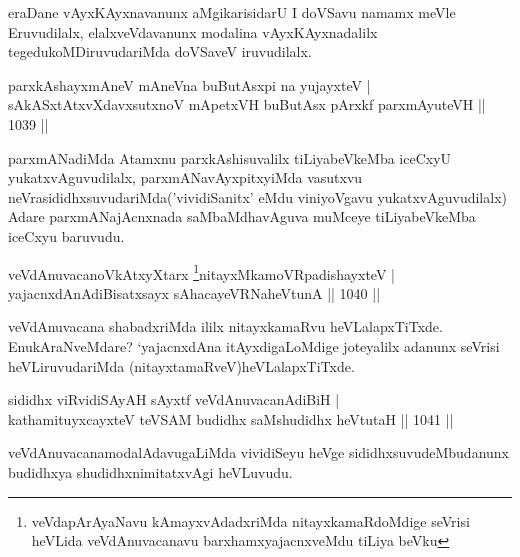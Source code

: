 \begin{artha}
eraDane vAyxKAyxnavanunx aMgikarisidarU I doVSavu namamx meVle Eruvudilalx, 
elalxveVdavanunx modalina vAyxKAyxnadalilx tegedukoMDiruvudariMda doVSaveV iruvudilalx.
\end{artha}


\begin{shl}
parxkAshayxmAneV mAneVna buButAsx\s pi na yujayxteV |\\
sAkASxtAtxvXdavxsutxnoV mApetxVH buButAsx pArxkf parxmAyuteVH || 1039 ||
\end{shl}

\begin{artha}
parxmANadiMda Atamxnu parxkAshisuvalilx tiLiyabeVkeMba iceCxyU yukatxvAguvudilalx, parxmANavAyxpitxyiMda vasutxvu neVrasididhxsuvudariMda('vividiSanitx' eMdu viniyoVgavu yukatxvAguvudilalx) Adare parxmANajAcnxnada saMbaMdhavAguva muMceye tiLiyabeVkeMba iceCxyu baruvudu.
\end{artha}



\begin{shl}
veVdAnuvacanoVkAtxyX\s tarx \footnote{veVdapArAyaNavu kAmayxvAdadxriMda nitayxkamaRdoMdige seVrisi heVLida 
veVdAnuvacanavu barxhamxyajacnxveMdu tiLiya beVku}nitayxMkamoVRpadishayxteV |\\
yajacnxdAnAdiBisatxsayx sAhacayeVRNaheVtunA || 1040 ||
\end{shl}

\begin{artha}
veVdAnuvacana shabadxriMda ililx nitayxkamaRvu heVLalapxTiTxde. EnukAraNveMdare? `yajacnxdAna itAyxdigaLoMdige joteyalilx adanunx seVrisi heVLiruvudariMda (nitayxtamaRveV)heVLalapxTiTxde.
\end{artha}

\begin{shl}
sididhx viRvidiSAyAH sAyxtf veVdAnuvacanAdiBiH |\\
kathamituyxcayxteV teVSAM budidhx saMshudidhx heVtutaH || 1041 ||
\end{shl}

\begin{artha}
veVdAnuvacanamodalAdavugaLiMda vividiSeyu heVge sididhxsuvudeMbudanunx budidhxya shudidhxnimitatxvAgi heVLuvudu.
\end{artha}

